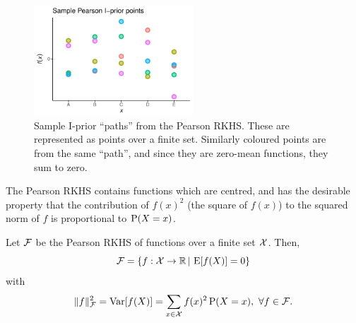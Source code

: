 \begin{figure}[hbt]
  \centering
  \includegraphics[width=0.53\textwidth]{figure/02-kernel_path_pearson}
  \caption[Sample I-prior ``paths'' from the Pearson RKHS]{Sample I-prior ``paths'' from the Pearson RKHS. These are represented as points over a finite set. Similarly coloured points are from the same ``path'', and since they are zero-mean functions, they sum to zero.}
\end{figure}

The Pearson RKHS contains functions which are centred, and has the desirable property that the contribution of $f(x)^2$ (the square of $f(x)$) to the squared norm of $f$ is proportional to $\operatorname{P}(X=x)$.

\begin{proposition}
  Let ${\mathcal F}$ be the Pearson RKHS of functions over a finite set ${\mathcal X}$.
  Then,
  \[
    {\mathcal F} = \{f:{\mathcal X}\to\mathbb{R} \,|\, \operatorname{E} [f(X)] = 0 \}
  \]
  with
  \[
    \lVert f\rVert_{\mathcal F}^2 = \operatorname{Var} [f(X)] = \sum_{x\in{\mathcal X}} f(x)^2 \operatorname{P}(X=x) , \ \forall f \in {\mathcal F}.
  \]
\end{proposition}

